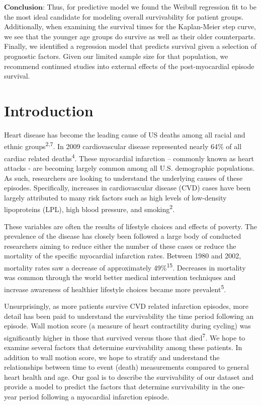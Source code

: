 \documentclass[
]{article}
\begin{document}
\(\textbf{Conclusion:}\) Thus, for predictive model we found the Weibull
regression fit to be the most ideal candidate for modeling overall
survivability for patient groups. Additionally, when examining the
survival times for the Kaplan-Meier step curve, we see that the younger
age groups do survive as well as their older counterparts. Finally, we
identified a regression model that predicts survival given a selection
of prognostic factors. Given our limited sample size for that
population, we recommend continued studies into external effects of the
post-myocardial episode survival.

\newpage

\hypertarget{introduction}{%
\section{Introduction}\label{introduction}}

Heart disease has become the leading cause of US deaths among all racial
and ethnic groups\textsuperscript{2,7}. In 2009 cardiovascular disease
represented nearly 64\% of all cardiac related
deaths\textsuperscript{4}. These myocardial infarction -- commonly known
as heart attacks - are becoming largely common among all U.S.
demographic populations. As such, researchers are looking to understand
the underlying causes of these episodes. Specifically, increases in
cardiovascular disease (CVD) cases have been largely attributed to many
risk factors such as high levels of low-density lipoproteins (LPL), high
blood pressure, and smoking\textsuperscript{2}.

These variables are often the results of lifestyle choices and effects
of poverty. The prevalence of the disease has closely been followed a
large body of conducted researchers aiming to reduce either the number
of these cases or reduce the mortality of the specific myocardial
infarction rates. Between 1980 and 2002, mortality rates saw a decrease
of approximately 49\%\textsuperscript{15}. Decreases in mortality was
common through the world better medical intervention techniques and
increase awareness of healthier lifestyle choices became more
prevalent\textsuperscript{5}.

Unsurprisingly, as more patients survive CVD related infarction
episodes, more detail has been paid to understand the survivability the
time period following an episode. Wall motion score (a measure of heart
contractility during cycling) was significantly higher in those that
survived versus those that died\textsuperscript{7}. We hope to examine
several factors that determine survivability among these patients. In
addition to wall motion score, we hope to stratify and understand the
relationships between time to event (death) measurements compared to
general heart health and age. Our goal is to describe the survivability
of our dataset and provide a model to predict the factors that determine
survivability in the one-year period following a myocardial infarction
episode.
\end{document}
